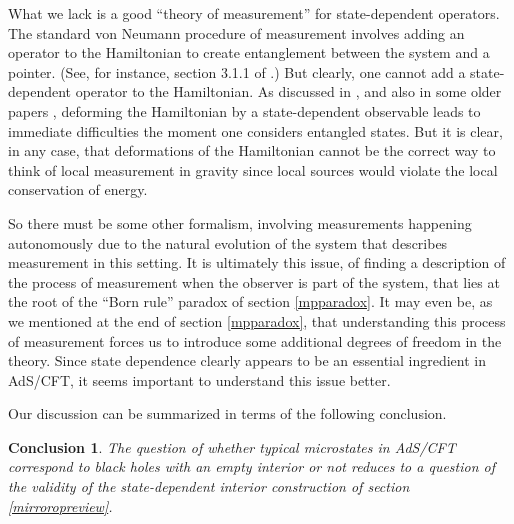 \documentclass[12pt]{article}
\newtheorem{lesson}{Conclusion}
\begin{document}
What we lack is a good ``theory of measurement'' for state-dependent operators. The standard von Neumann procedure of measurement involves adding an operator to the Hamiltonian to create entanglement between the system and a pointer. (See, for instance, section 3.1.1 of  \cite{preskill1998lecture}.) But clearly, one cannot add a state-dependent operator to the Hamiltonian. As discussed in  \cite{Kapustin:2013yda}, and also in some older papers  \cite{gisin1990weinberg,PhysRevLett.66.397}, deforming the Hamiltonian by a state-dependent observable leads to immediate difficulties the moment one considers entangled states. But it is clear, in any case, that deformations of the Hamiltonian cannot be the correct way to think of local measurement in gravity since local sources would violate the local conservation of energy. 

So there must be some other formalism, involving measurements happening autonomously due to the natural evolution of the system that describes measurement in this setting. It is ultimately this issue, of finding a description of the process of measurement when the observer is part of the system, that lies at the root of the ``Born rule'' paradox of section \ref{mpparadox}.  It may even be, as we mentioned at the end of section \ref{mpparadox}, that understanding this process of measurement forces us to introduce some additional degrees of freedom in the theory.  Since state dependence clearly appears to be an essential ingredient in AdS/CFT, it seems important to understand this issue better.




Our discussion can be summarized in terms of the following conclusion.
\begin{lesson}
\label{lessonlargebh}
The question of whether typical microstates in AdS/CFT correspond to black holes with an empty interior or not reduces to a question of the validity of the state-dependent interior construction of section \ref{mirroropreview}.
\end{lesson}
\end{document}
